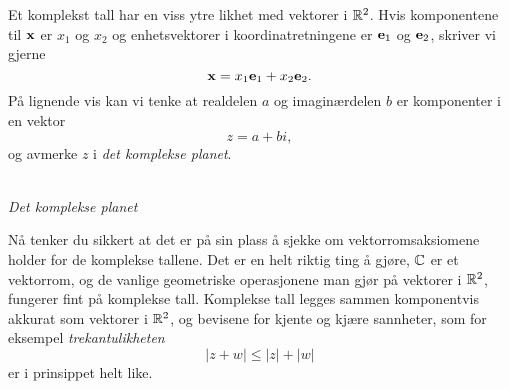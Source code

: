 Et komplekst tall har en viss ytre likhet med vektorer i $\mathbb{R}^2$. 
Hvis komponentene til $\mathbf{x}$ er $x_1$ og $x_2$ og enhetsvektorer i koordinatretningene er $\mathbf{e}_1$ og $\mathbf{e}_2$, 
skriver vi gjerne
\[
\mathbf{x}=x_1 \mathbf{e}_1+x_2 \mathbf{e}_2.
\]
På lignende vis kan vi tenke at realdelen $a$ og imaginærdelen $b$ er komponenter i en vektor
\[
z=a+bi,
\] 
og avmerke $z$ i \emph{det komplekse planet}.
\begin{center}
\\
{\small \textit{Det komplekse planet}}
\end{center}
Nå tenker du sikkert at det er på sin plass å sjekke om vektorromsaksiomene holder for de komplekse tallene. 
Det er en helt riktig ting å gjøre, $\mathbb{C}$ er et vektorrom, 
og de vanlige geometriske operasjonene man gjør på vektorer i $\mathbb{R}^2$, 
fungerer fint på komplekse tall. 
Komplekse tall legges sammen komponentvis akkurat som vektorer i $\mathbb{R}^2$, 
og bevisene for kjente og kjære sannheter, som for eksempel \emph{trekantulikheten}
\[
|z+w|\leq |z| + |w|
\]
er i prinsippet helt like.


